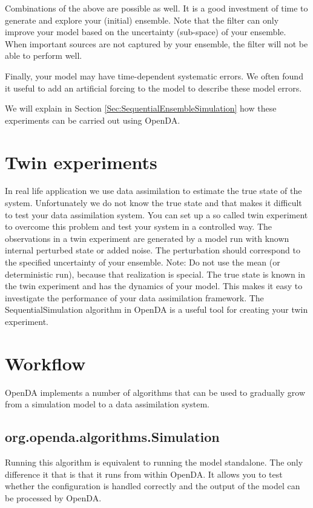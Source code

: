 \documentclass[a4paper,10pt]{article}
\begin{document}
Combinations of the above are possible as well. It is a good investment of time to generate and explore your (initial) ensemble. Note that the filter can only improve your model based on the uncertainty (sub-space) of your ensemble. When important sources are not captured by your ensemble, the filter will not be able to perform well. 

Finally, your model may have time-dependent systematic errors. We often found it useful to add an artificial forcing to the model to describe these model errors.

We will explain in Section \ref{Sec:SequentialEnsembleSimulation} how these experiments can be carried out using OpenDA.


\section{Twin experiments} \label{Sec:Twin}
In real life application we use data assimilation to estimate the true state of the system. Unfortunately we do not know the true state and that makes it difficult to test your data assimilation system. You can set up a so called twin experiment to overcome this problem and test your system in a controlled way. The observations in a twin experiment are generated by a model run with known internal perturbed state or added noise. The perturbation should correspond to the specified uncertainty of your ensemble. Note: Do not use the mean (or deterministic run), because that realization is special. The true state is known in the twin experiment and has the dynamics of your model. This makes it easy to investigate the performance of your data assimilation framework. The SequentialSimulation algorithm in OpenDA is a useful tool for creating your twin experiment.


\section{Workflow}
OpenDA implements a number of algorithms that can be used to gradually grow from a simulation model to a data assimilation system.
\subsection{org.openda.algorithms.Simulation}
Running this algorithm is equivalent to running the model standalone. The only difference it that is that it runs from within OpenDA. It allows you to test whether the configuration is handled correctly and the output of the model can be processed by OpenDA. 
\end{document}
